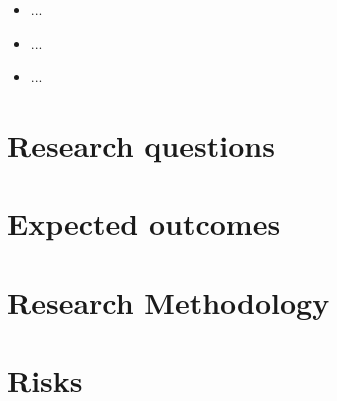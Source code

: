 \documentclass[10pt,a4paper]{proposal}
\begin{document}
\begin{itemize}
\item ...
\item ...
\item ...
\end{itemize}


\section*{Research questions}


\section*{Expected outcomes}


\section*{Research Methodology}


\section*{Risks}
\end{document}
